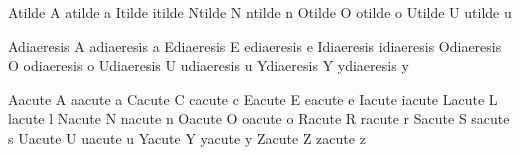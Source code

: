  Atilde           {\buildtextaccent\texttilde A}
 atilde           {\buildtextaccent\texttilde a}
 Itilde           {\buildtextaccent\texttilde \dotlessI}
 itilde           {\buildtextaccent\texttilde \dotlessi}
 Ntilde           {\buildtextaccent\texttilde N}
 ntilde           {\buildtextaccent\texttilde n}
 Otilde           {\buildtextaccent\texttilde O}
 otilde           {\buildtextaccent\texttilde o}
 Utilde           {\buildtextaccent\texttilde U}
 utilde           {\buildtextaccent\texttilde u}

 Adiaeresis       {\buildtextaccent\textdiaeresis A}
 adiaeresis       {\buildtextaccent\textdiaeresis a}
 Ediaeresis       {\buildtextaccent\textdiaeresis E}
 ediaeresis       {\buildtextaccent\textdiaeresis e}
 Idiaeresis       {\buildtextaccent\textdiaeresis \dotlessI}
 idiaeresis       {\buildtextaccent\textdiaeresis \dotlessi}
 Odiaeresis       {\buildtextaccent\textdiaeresis O}
 odiaeresis       {\buildtextaccent\textdiaeresis o}
 Udiaeresis       {\buildtextaccent\textdiaeresis U}
 udiaeresis       {\buildtextaccent\textdiaeresis u}
 Ydiaeresis       {\buildtextaccent\textdiaeresis Y}
 ydiaeresis       {\buildtextaccent\textdiaeresis y}

 Aacute           {\buildtextaccent\textacute A}
 aacute           {\buildtextaccent\textacute a}
 Cacute           {\buildtextaccent\textacute C}
 cacute           {\buildtextaccent\textacute c}
 Eacute           {\buildtextaccent\textacute E}
 eacute           {\buildtextaccent\textacute e}
 Iacute           {\buildtextaccent\textacute \dotlessI}
 iacute           {\buildtextaccent\textacute \dotlessi}
 Lacute           {\buildtextaccent\textacute L}
 lacute           {\buildtextaccent\textacute l}
 Nacute           {\buildtextaccent\textacute N}
 nacute           {\buildtextaccent\textacute n}
 Oacute           {\buildtextaccent\textacute O}
 oacute           {\buildtextaccent\textacute o}
 Racute           {\buildtextaccent\textacute R}
 racute           {\buildtextaccent\textacute r}
 Sacute           {\buildtextaccent\textacute S}
 sacute           {\buildtextaccent\textacute s}
 Uacute           {\buildtextaccent\textacute U}
 uacute           {\buildtextaccent\textacute u}
 Yacute           {\buildtextaccent\textacute Y}
 yacute           {\buildtextaccent\textacute y}
 Zacute           {\buildtextaccent\textacute Z}
 zacute           {\buildtextaccent\textacute z}


